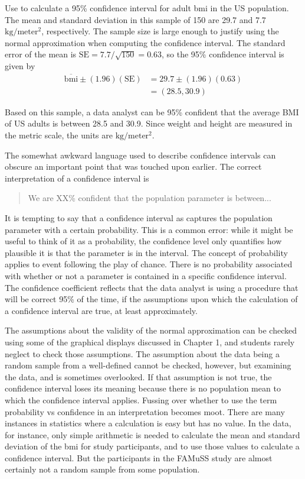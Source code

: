 \begin{spacing}{1.5}
\begin{example}{Use  to calculate a 95\% confidence interval for adult bmi in the US population. \label{exNhanesBmi}}
	The mean and standard deviation in this sample of 150 are 29.7 and 7.7 $\text{kg}/\text{meter}{^2}$, respectively.  The sample size is large enough to justify using the normal approximation when computing the confidence interval.  The standard error of the mean is $\text{SE} = 7.7/\sqrt{150} = 0.63$, so the 95\% confidence interval is given by 
\begin{align*}
	\overline{\text{bmi}} \pm (1.96)(\text{SE}) &= 29.7 \pm (1.96)(0.63) \\
	&= (28.5, 30.9)
\end{align*}	
	
	Based on this sample, a data analyst can be 95\% confident that the average BMI of US adults is between 28.5 and 30.9.  Since weight and height are measured in the metric scale, the units are $\text{kg}/\text{meter}{^2}$.
\end{example}


The somewhat awkward language used to describe confidence intervals can obscure an important point that was touched upon earlier.  The correct interpretation of a confidence interval is 
\begin{quote}
We are XX\% confident that the population parameter is between...
\end{quote}
It is tempting to say that a confidence interval as captures the population parameter with a certain probability. This is a common error: while it might be useful to think of it as a probability, the confidence level only quantifies how plausible it is that the parameter is in the interval.  The concept of probability applies to event following the play of chance.  There is no probability associated with whether or not a parameter is contained in a specific confidence interval.  The confidence coefficient reflects that the data analyst is using a procedure that will be correct 95\% of the time, if the assumptions upon which the calculation of a confidence  interval are true, at least approximately.


The assumptions about the validity of the normal approximation can be checked using some of the graphical displays discussed in Chapter 1, and students rarely neglect to check those assumptions. The assumption about the data being a random sample from a well-defined cannot be checked, however, but examining the data, and is sometimes overlooked. If that assumption is not true, the confidence interval loses its meaning because there is no population mean to which the confidence interval applies. Fussing over whether to use the term probability vs confidence in an interpretation becomes moot.  There are many instances in statistics where a calculation is easy but has no value.  In the  data, for instance, only simple arithmetic is needed to calculate the mean and standard deviation of the bmi for study participants, and to use those values to calculate a confidence interval.  But the participants in the FAMuSS study are almost certainly not a random sample from some population. 



\end{spacing}
